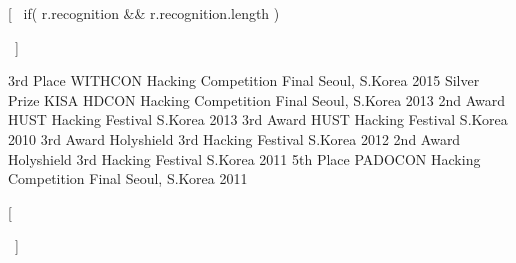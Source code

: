 [~ if( r.recognition && r.recognition.length ) { ~]
\begin{cvhonors}
\end{cvhonors}

\begin{cvhonors}
  \cvhonor
    {3rd Place}
    {WITHCON Hacking Competition Final}
    {Seoul, S.Korea}
    {2015}
  \cvhonor
    {Silver Prize}
    {KISA HDCON Hacking Competition Final}
    {Seoul, S.Korea}
    {2013}
  \cvhonor
    {2nd Award}
    {HUST Hacking Festival}
    {S.Korea}
    {2013}
  \cvhonor
    {3rd Award}
    {HUST Hacking Festival}
    {S.Korea}
    {2010}
  \cvhonor
    {3rd Award}
    {Holyshield 3rd Hacking Festival}
    {S.Korea}
    {2012}
  \cvhonor
    {2nd Award}
    {Holyshield 3rd Hacking Festival}
    {S.Korea}
    {2011}
  \cvhonor
    {5th Place}
    {PADOCON Hacking Competition Final}
    {Seoul, S.Korea}
    {2011}
\end{cvhonors}
[~ } ~]
